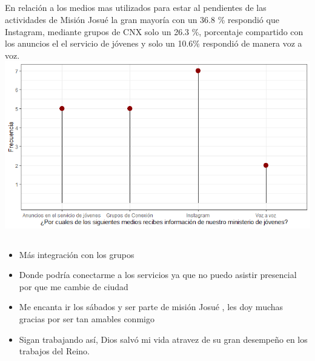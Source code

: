 \documentclass{beamer}
\begin{document}
\subsection{}
\begin{frame}{}
\vspace{-0.9\baselineskip}
\begin{tcolorbox}[colback=backframe_color,colframe=beamer_color,title=] 
En relación a los medios mas utilizados para estar al pendientes de las actividades de Misión Josué la gran mayoría con un 36.8 \% respondió que Instagram, mediante grupos de CNX solo un 26.3 \%, porcentaje compartido con los anuncios el el servicio de jóvenes y solo un 10.6\% respondió de manera voz a voz. 
\includegraphics[width=0.95\linewidth]{special_figures/Rplot01_3.png}
\end{tcolorbox}
\end{frame}



\subsection{}
\begin{frame}{}
\vspace{-0.9\baselineskip}
\begin{tcolorbox}[colback=backframe_color,colframe=beamer_color,title= Comentarios de los participantes] 
\begin{itemize}
    \item Más integración con los grupos 
    \item Donde podría conectarme a los servicios ya que no puedo asistir presencial por que me cambie de ciudad 
    \item Me encanta ir los sábados y ser parte de misión Josué , les doy muchas gracias por ser tan amables conmigo
    \item Sigan trabajando así, Dios salvó mi vida atravez de su gran desempeño en los trabajos del Reino.

\end{itemize}
\end{tcolorbox}
\end{frame}
\end{document}

